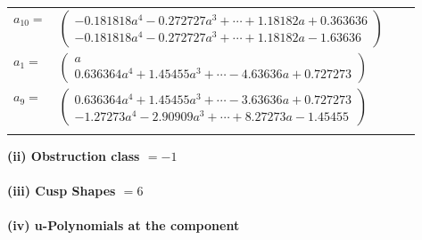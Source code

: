 \documentclass[1p]{elsarticle_modified}
\theoremstyle{definition}
\begin{document}
\begin{tabular}{m{7pt} m{180pt} m{7pt} m{180pt} }
\flushright $a_{10}=$&$\begin{pmatrix}-0.181818 a^{4}-0.272727 a^{3}+\cdots+1.18182 a+0.363636\\-0.181818 a^{4}-0.272727 a^{3}+\cdots+1.18182 a-1.63636\end{pmatrix}$ \\
\flushright $a_{1}=$&$\begin{pmatrix}a\\0.636364 a^{4}+1.45455 a^{3}+\cdots-4.63636 a+0.727273\end{pmatrix}$ \\
\flushright $a_{9}=$&$\begin{pmatrix}0.636364 a^{4}+1.45455 a^{3}+\cdots-3.63636 a+0.727273\\-1.27273 a^{4}-2.90909 a^{3}+\cdots+8.27273 a-1.45455\end{pmatrix}$\\&\end{tabular}
\flushleft \textbf{(ii) Obstruction class $= -1$}\\~\\
\flushleft \textbf{(iii) Cusp Shapes $= 6$}\\~\\
\newpage\renewcommand{\arraystretch}{1}
\flushleft \textbf{(iv) u-Polynomials at the component}\newline \\
\end{document}
